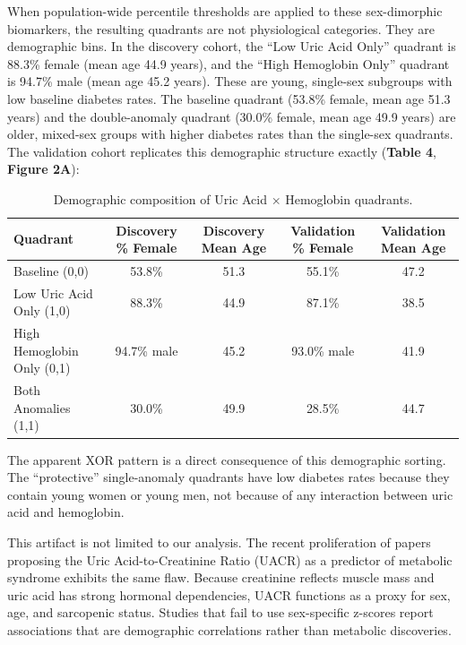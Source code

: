 \documentclass[10pt,letterpaper]{article}
\begin{document}
When population-wide percentile thresholds are applied to these sex-dimorphic biomarkers, the resulting quadrants are not physiological categories. They are demographic bins. In the discovery cohort, the ``Low Uric Acid Only'' quadrant is 88.3\% female (mean age 44.9 years), and the ``High Hemoglobin Only'' quadrant is 94.7\% male (mean age 45.2 years). These are young, single-sex subgroups with low baseline diabetes rates. The baseline quadrant (53.8\% female, mean age 51.3 years) and the double-anomaly quadrant (30.0\% female, mean age 49.9 years) are older, mixed-sex groups with higher diabetes rates than the single-sex quadrants. The validation cohort replicates this demographic structure exactly (\textbf{Table 4}, \textbf{Figure 2A}):

\begin{table}[htbp]
\centering
\small
\begin{threeparttable}
\caption{Demographic composition of Uric Acid $\times$ Hemoglobin quadrants.}
\begin{tabular*}{\linewidth}{@{\extracolsep{\fill}}lcccc@{}}
\toprule
\textbf{Quadrant} & \textbf{Discovery \% Female} & \textbf{Discovery Mean Age} & \textbf{Validation \% Female} & \textbf{Validation Mean Age} \\
\midrule
Baseline (0,0) & 53.8\% & 51.3 & 55.1\% & 47.2 \\
Low Uric Acid Only (1,0) & 88.3\% & 44.9 & 87.1\% & 38.5 \\
High Hemoglobin Only (0,1) & 94.7\% male & 45.2 & 93.0\% male & 41.9 \\
Both Anomalies (1,1) & 30.0\% & 49.9 & 28.5\% & 44.7 \\
\bottomrule
\end{tabular*}
\end{threeparttable}
\end{table}

The apparent XOR pattern is a direct consequence of this demographic sorting. The ``protective'' single-anomaly quadrants have low diabetes rates because they contain young women or young men, not because of any interaction between uric acid and hemoglobin.

This artifact is not limited to our analysis. The recent proliferation of papers proposing the Uric Acid-to-Creatinine Ratio (UACR) as a predictor of metabolic syndrome exhibits the same flaw. Because creatinine reflects muscle mass and uric acid has strong hormonal dependencies, UACR functions as a proxy for sex, age, and sarcopenic status. Studies that fail to use sex-specific z-scores report associations that are demographic correlations rather than metabolic discoveries.
\end{document}
